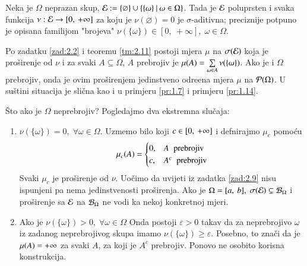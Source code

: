\begin{nap} \label{nap:2.12}
    Neka je $\Omega$ neprazan skup, $\mathcal{E} := \{\varnothing\} \cup \{{\{ \omega \}} \: | \: {\omega \in \Omega}\}$.
    Tada je $\mathcal{E}$ poluprsten i svaka funkcija $\nu: \mathcal{E} \to [0, \: +\infty]$ za koju je $\nu(\varnothing) = 0$ je $\sigma$-aditivna;
    preciznije potpuno je opisana familijom "brojeva" $\nu(\{ \omega \}) \in [0, \: +\infty], \; \omega \in \Omega$.

    Po zadatku \ref{zad:2.2} i teoremu \ref{tm:2.11} postoji mjera $\mu$ na $\sigma({\mathcal{E}})$ koja je pro\v sirenje od $\nu$ i za svaki $A \subseteq \Omega$, $A$ prebrojiv je $\mu({A}) = \sum\limits_{\omega \in A}^{} \nu(\{ \omega \})$.
    Ako je i $\Omega$ prebrojiv, onda je ovim pro\v sirenjem jedinstveno odre\dj ena mjera $\mu$ na $\mathcal{P}({\Omega})$.
    U su\v stini situacija je sli\v cna kao i u primjeru \ref{pr:1.7} i primjeru \ref{pr:1.14}.

    \v Sto ako je $\Omega$ neprebrojiv?
    Pogledajmo dva ekstremna slu\v caja:
    \begin{enumerate}[label=(\roman*)]
        \item $\nu(\{ \omega \}) = 0, \; \forall \omega \in \Omega$.
        Uzmemo bilo koji $c \in [{0}, \:{+\infty}]$ i defnirajmo $\mu_c$ pomo\' cu
        \begin{equation*}
            \mu_c(A) = 
            \begin{cases}
                0, &A \;\; \textnormal{prebrojiv}\\
                c, &A^c \;\; \textnormal{prebrojiv}
            \end{cases}
        \end{equation*}
        Svaki $\mu_c$ je pro\v sirenje od $\nu$.
        Uo\v cimo da uvijeti iz zadatka \ref{zad:2.9} nisu ispunjeni pa nema jedinstvenosti pro\v sirenja.
        Ako je $\Omega = [{a}, \:{b}], \; \sigma({\mathcal{E}}) \subsetneq \mathcal{B}_{\Omega}$ i pro\v sirenje sa $\mathcal{E}$ na $\mathcal{B}_{\Omega}$ ne vodi ka nekoj konkretnoj mjeri.
        \item Ako je $\nu(\{\omega\}) > 0, \; \forall \omega \in \Omega$ Onda postoji $\varepsilon > 0$ takav da za neprebrojivo $\omega$ iz zadanog neprebrojivog skupa imamo $\nu(\{\omega\}) \geq \varepsilon$.
        Posebno, to zna\v ci da je $\mu({A}) = +\infty$ za svaki $A$, za koji je $A^c$ prebrojiv.
        Ponovo ne osobito korisna konstrukcija.
    \end{enumerate}
\end{nap}

